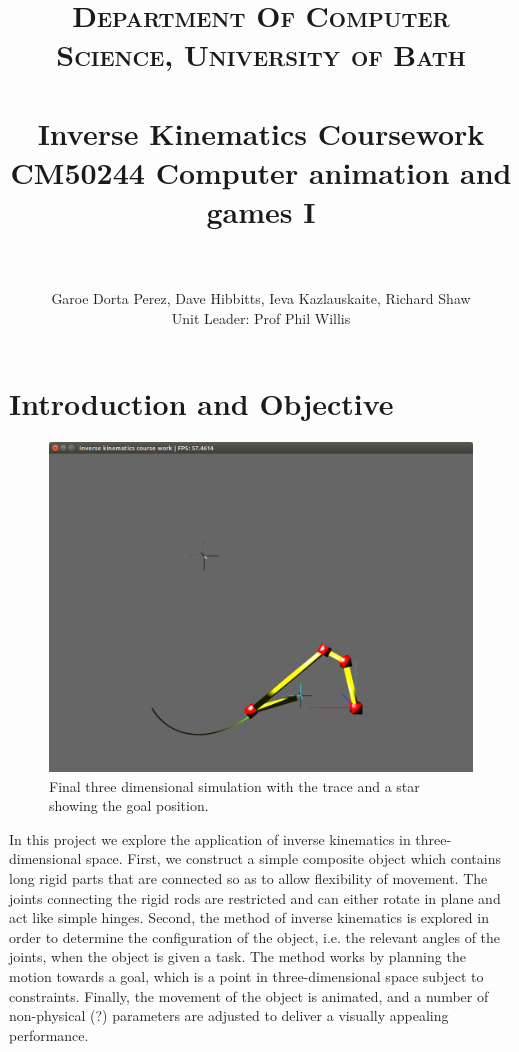 \documentclass[paper=a4, fontsize=11pt]{scrartcl} %
\title{	
\normalfont \normalsize 
\textsc{Department Of Computer Science, University of Bath} \\ [5pt] %
\horrule{0.7pt} \\[0.2cm] %
\Huge Inverse Kinematics Coursework \\ %
\vspace{7 mm}
\Large CM50244 \: Computer animation and games I \\
\horrule{0.7pt} \\[0.0cm] %
}
\author{Garoe Dorta Perez, Dave Hibbitts, Ieva Kazlauskaite, Richard Shaw \\ \Large Unit Leader: Prof Phil Willis \\}  %
\numberwithin{equation}{section} %
\numberwithin{figure}{section} %
\numberwithin{table}{section} %
\begin{document}
\vspace*{\fill}
\begin{center}
\begin{minipage}{1.0\textwidth}

\clearpage\maketitle %
\thispagestyle{empty}

\end{minipage}
\end{center}
\vfill
\clearpage
\setcounter{page}{1}

\section{Introduction and Objective}

\begin{center}
\begin{figure}
\includegraphics[scale=0.4]{chain3Dexample}
\caption{Final three dimensional simulation with the trace and a star showing the goal position.}
\end{figure}
\end{center}
 
In this project we explore the application of inverse kinematics in three-dimensional space. First, we construct a simple composite object which contains long rigid parts that are connected so as to allow flexibility of movement. The joints connecting the rigid rods are restricted and can either rotate in plane and act like simple hinges. Second, the method of inverse kinematics is explored in order to determine the configuration of the object, i.e. the relevant angles of the joints, when the object is given a task. The method works by planning the motion towards a goal, which is a point in three-dimensional space subject to constraints. Finally, the movement of the object is animated, and a number of non-physical (?) parameters are adjusted to deliver a visually appealing performance. \\
\end{document}
